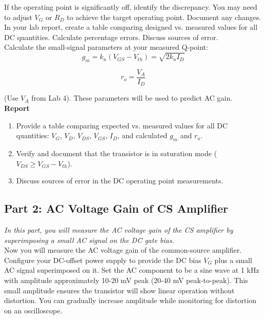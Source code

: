 \documentclass[10pt]{article}
\begin{document}
If the operating point is significantly off, identify the discrepancy. You may need to adjust $V_G$ or $R_D$ to achieve the target operating point. Document any changes. \\

In your lab report, create a table comparing designed vs. measured values for all DC quantities. Calculate percentage errors.  Discuss sources of error. \\

Calculate the small-signal parameters at your measured Q-point: \\

\begin{equation}
    g_m = k_n (V_{GS} - V_{th}) = \sqrt{2 k_n I_D}
\end{equation}

\begin{equation}
    r_o = \frac{V_A}{I_D}
\end{equation}

(Use $V_A$ from Lab 4). These parameters will be used to predict AC gain.   \\

\textbf{Report}
\begin{enumerate}
    \item Provide a table comparing expected vs. measured values for all DC quantities: $V_G$, $V_D$, $V_{DS}$, $V_{GS}$, $I_D$, and calculated $g_m$ and $r_o$.
    \item Verify and document that the transistor is in saturation mode ($V_{DS} \geq V_{GS} - V_{th}$).
    \item Discuss sources of error in the DC operating point measurements.\\
\end{enumerate}


\subsection{Part 2: AC Voltage Gain of CS Amplifier}

\textit{In this part, you will measure the AC voltage gain of the CS amplifier by superimposing a small AC signal on the DC gate bias.} \\

Now you will measure the AC voltage gain of the common-source amplifier.\\

Configure your DC-offset power supply to provide the DC bias $V_G$ plus a small AC signal superimposed on it. Set the AC component to be a sine wave at 1 kHz with amplitude approximately 10-20 mV peak (20-40 mV peak-to-peak). This small amplitude ensures the transistor will show linear operation without distortion.  You can gradually increase amplitude while monitoring for distortion on an oscilloscope.\\
\end{document}
